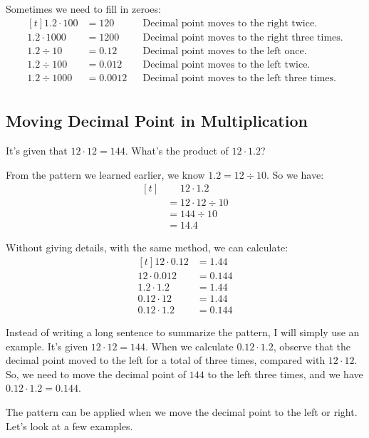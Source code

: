 Sometimes we need to fill in zeroes:
\[
\begin{aligned}[t]
	1.2\cdot100 &= 120 &&\text{Decimal point moves to the right twice.}\\
	1.2\cdot1000 &= 1200 &&\text{Decimal point moves to the right three times.}\\
	1.2\div10 &= 0.12 &&\text{Decimal point moves to the left once.}\\
	1.2\div100 &= 0.012 &&\text{Decimal point moves to the left twice.}\\
	1.2\div1000 &= 0.0012 &&\text{Decimal point moves to the left three times.}\\
\end{aligned}
\]

\subsection{Moving Decimal Point in Multiplication}
It's given that $12\cdot12=144$. What's the product of $12\cdot1.2$?

From the pattern we learned earlier, we know $1.2=12\div10$. So we have:
\[ 
\begin{aligned}[t]
	&\phantom{{}=}12\cdot1.2 \\
	&=12\cdot12\div10 \\
	&=144\div10 \\
	&=14.4
\end{aligned}
\]

Without giving details, with the same method, we can calculate:
\[ 
\begin{aligned}[t]
	12\cdot0.12 &= 1.44 \\
	12\cdot0.012 &= 0.144 \\
	1.2\cdot1.2 &= 1.44 \\
	0.12\cdot12 &= 1.44 \\
	0.12\cdot1.2 &= 0.144
\end{aligned}
\]

Instead of writing a long sentence to summarize the pattern, I will simply use an example. It's given $12\cdot12=144$. When we calculate $0.12\cdot1.2$, observe that the decimal point moved to the left for a total of three times, compared with $12\cdot12$. So, we need to move the decimal point of $144$ to the left three times, and we have $0.12\cdot1.2=0.144$.

The pattern can be applied when we move the decimal point to the left or right. Let's look at a few examples.

